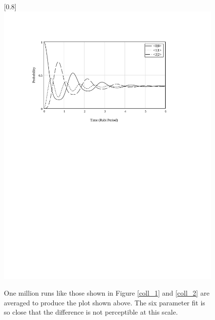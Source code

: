 \begin{figure}
\scalebox{0.8}[0.8]{
\includegraphics[bb=30 455 489 685]
{average/average.pdf}
}
\caption[Average dynamics of one million stochastic runs]{One million runs like those shown in Figure \ref{coll_1} and \ref{coll_2} are averaged to produce the plot shown above. The six parameter fit is so close that the difference is not perceptible at this scale.}
\label{average}
\end{figure}
